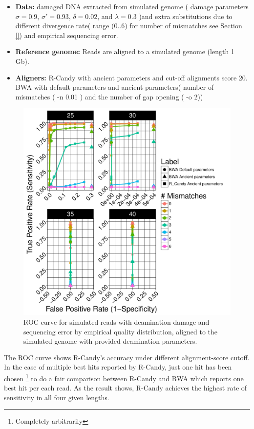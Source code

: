 \documentclass[11pt,a4paper]{report}
\begin{document}
\begin{itemize}
   \item \textbf{Data:} damaged DNA extracted from simulated genome (
   damage parameters $ \sigma = 0.9$, 
$ \sigma\prime = 0.93 $, $\delta = 0.02 $,  and $\lambda = 0.3 $ )and extra 
substitutions due to different divergence rate( range (0..6) for number of mismatches 
see Section \ref{}) and empirical sequencing error.
  \item \textbf{Reference genome:}  Reads are aligned to a simulated genome 
(length 1 Gb).
  \item \textbf{Aligners:} R-Candy with ancient parameters and cut-off alignments 
score 20. \\BWA with default parameters and ancient parameters( number of 
mismatches ( -n 0.01 ) and the number of gap opening ( -o 2))

  \end{itemize}

\begin{figure}[H]
\centering
\includegraphics[width=12cm]{pictures/bROC_DS1_emp.pdf}
\caption{ROC curve for simulated reads with deamination damage and sequencing 
error by empirical quality distribution, aligned to the simulated genome
with provided deamination parameters.}
\label{DS1_emp}
\end{figure}


The ROC curve shows R-Candy's accuracy under different alignment-score cutoff.
In the case of multiple best hits reported by R-Candy, just one hit has been 
chosen \footnote{Completely arbitrarily} to do a fair comparison 
between R-Candy and BWA which reports one best hit per each read.
As the result shows, R-Candy achieves the highest rate of sensitivity
in all four given lengths.
\end{document}
